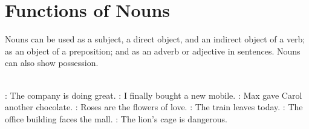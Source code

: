 \chapter{Functions of Nouns}
Nouns can be used as a subject, a direct object, and an indirect object of a verb; as an object of a preposition; and as an adverb or adjective in sentences. Nouns can also show possession.\\\\

\begin{itemize}
    : The company is doing great.
    : I finally bought a new mobile.
    : Max gave Carol another chocolate.
    : Roses are the flowers of love.
    : The train leaves today.
    : The office building faces the mall.
    : The lion’s cage is dangerous.
\end{itemize}